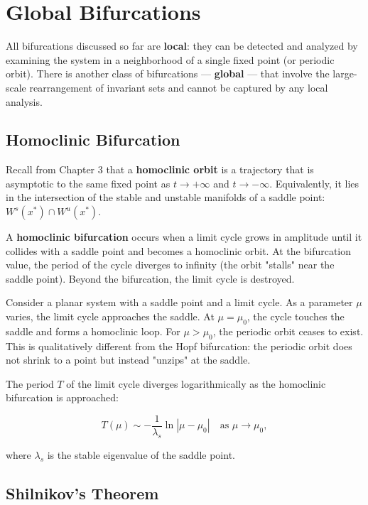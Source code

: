 \section{Global Bifurcations}\label{sec:5.7}

All bifurcations discussed so far are \textbf{local}: they can be detected and analyzed by examining the system in a neighborhood of a single fixed point (or periodic orbit). There is another class of bifurcations --- \textbf{global} --- that involve the large-scale rearrangement of invariant sets and cannot be captured by any local analysis.

\subsection{Homoclinic Bifurcation}\label{sec:5.7.1}

Recall from Chapter 3 that a \textbf{homoclinic orbit} is a trajectory that is asymptotic to the same fixed point as $t \to +\infty$ and $t \to -\infty$. Equivalently, it lies in the intersection of the stable and unstable manifolds of a saddle point: $W^s(x^*) \cap W^u(x^*)$.

A \textbf{homoclinic bifurcation} occurs when a limit cycle grows in amplitude until it collides with a saddle point and becomes a homoclinic orbit. At the bifurcation value, the period of the cycle diverges to infinity (the orbit "stalls" near the saddle point). Beyond the bifurcation, the limit cycle is destroyed.

\begin{example}
Consider a planar system with a saddle point and a limit cycle. As a parameter $\mu$ varies, the limit cycle approaches the saddle. At $\mu = \mu_0$, the cycle touches the saddle and forms a homoclinic loop. For $\mu > \mu_0$, the periodic orbit ceases to exist. This is qualitatively different from the Hopf bifurcation: the periodic orbit does not shrink to a point but instead "unzips" at the saddle.

The period $T$ of the limit cycle diverges logarithmically as the homoclinic bifurcation is approached:

\[
T(\mu) \sim -\frac{1}{\lambda_s} \ln |\mu - \mu_0| \quad \text{as } \mu \to \mu_0,
\]

where $\lambda_s$ is the stable eigenvalue of the saddle point.
\end{example}


\subsection{Shilnikov's Theorem}\label{sec:5.7.2}

